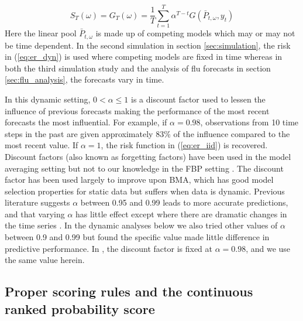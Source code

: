 \begin{equation}
   S_T(\omega) = G_T(\omega) = \frac{1}{T}\sum_{t = 1}^T \alpha^{T-t} 
   G(\bar{P}_{t, \omega}, y_t)
    \label{eq:er_dyn}
\end{equation}
Here the linear pool 
$\bar{P}_{t, \omega}$ is made up of competing models which may or may not be 
time dependent. In the second simulation in section \ref{sec:simulation}, 
the risk in (\ref{eq:er_dyn}) is used where competing models are fixed in 
time whereas in both the third simulation study and 
the analysis of flu forecasts in section 
\ref{sec:flu_analysis}, the forecasts vary in time.

In this dynamic setting, $0 < \alpha \leq 1$ is a discount factor 
used to lessen the influence of 
previous forecasts making the performance of the most recent forecasts 
the most influential. For example, if $\alpha = 0.98$, 
observations from 10 time steps in the past
are given approximately 83\% of the influence compared to the most recent value.
If $\alpha = 1$, the risk function in 
(\ref{eq:er_iid}) is recovered.
Discount factors (also known as forgetting factors)
have been used in the model averaging setting but not
to our knowledge in the FBP setting 
\cite[]{bernaciak2024loss,lavine2021adaptive, zhao2016dynamic, 
koop2013large,raftery2010online}. 
The discount
factor has been used largely to improve upon BMA, which has good model
selection properties for static data but suffers when data is dynamic. 
Previous literature suggests $\alpha$ 
between 0.95 and 0.99 leads to more accurate predictions, and that varying 
$\alpha$ has little effect except where there are dramatic changes in the 
time series \cite[]{lavine2021adaptive, koop2013large}. 
In the dynamic analyses below
we also tried other values of $\alpha$ between 0.9 and 0.99 but 
found the specific value made little difference in predictive performance.
In \cite{lavine2021adaptive}, the discount factor is 
fixed at $\alpha = 0.98$, and we use the same value herein. 







\subsection{Proper scoring rules and the continuous ranked probability score} 
\label{sec:prop_score}

